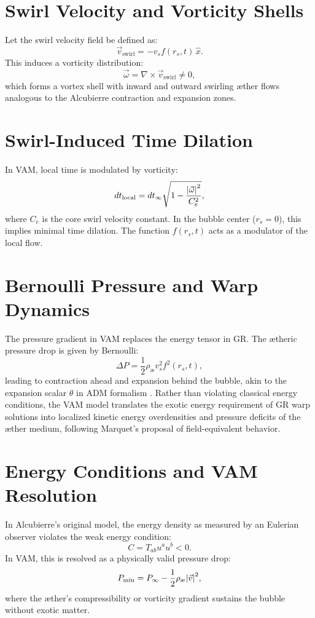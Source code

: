 \documentclass[12pt]{article}
\begin{document}
\section{Swirl Velocity and Vorticity Shells}
Let the swirl velocity field be defined as:
\begin{equation}
    \vec{v}_{\text{swirl}} = -v_s f(r_s, t)\, \hat{x}.
\end{equation}
This induces a vorticity distribution:
\begin{equation}
    \vec{\omega} = \nabla \times \vec{v}_{\text{swirl}} \neq 0,
\end{equation}
which forms a vortex shell with inward and outward swirling æther flows analogous to the Alcubierre contraction and expansion zones.

\section{Swirl-Induced Time Dilation}
In VAM, local time is modulated by vorticity:
\begin{equation}
    dt_{\text{local}} = dt_{\infty} \sqrt{1 - \frac{\abs{\vec{\omega}}^2}{C_e^2}},
\end{equation}
where \( C_e \) is the core swirl velocity constant. In the bubble center (\( r_s = 0 \)), this implies minimal time dilation. The function \( f(r_s, t) \) acts as a modulator of the local flow.

\section{Bernoulli Pressure and Warp Dynamics}
The pressure gradient in VAM replaces the energy tensor in GR. The ætheric pressure drop is given by Bernoulli:
\begin{equation}
    \Delta P = \frac{1}{2} \rho_\text{\ae} v_s^2 f^2(r_s, t),
\end{equation}
leading to contraction ahead and expansion behind the bubble, akin to the expansion scalar \( \theta \) in ADM formalism \cite{marquet2009warp}.
Rather than violating classical energy conditions, the VAM model translates the exotic energy requirement of GR warp solutions into localized kinetic energy overdensities and pressure deficits of the æther medium, following Marquet's proposal of field-equivalent behavior.

\section{Energy Conditions and VAM Resolution}
In Alcubierre’s original model, the energy density as measured by an Eulerian observer violates the weak energy condition:
\begin{equation}
    C = T_{ab} u^a u^b < 0.
\end{equation}
In VAM, this is resolved as a physically valid pressure drop:
\begin{equation}
    P_{\text{min}} = P_\infty - \frac{1}{2} \rho_\text{\ae} \abs{\vec{v}}^2,
\end{equation}
where the æther’s compressibility or vorticity gradient sustains the bubble without exotic matter.
\end{document}
